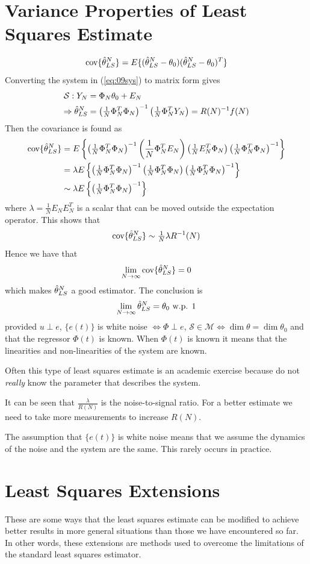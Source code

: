 \section{Variance Properties of Least Squares Estimate}
$$\text{cov}\{\hat{\theta}_{LS}^N\} = E\{(\hat{\theta}_{LS}^N-\theta_0)(\hat{\theta}_{LS}^N-\theta_0)^T\}$$
Converting the system in (\ref{eq:09sys}) to matrix form gives
\begin{align*}
\mathcal{S}: Y_N &= \Phi_N\theta_0+E_N \\
\Rightarrow \hat{\theta}_{LS}^N &= \left(\tfrac{1}{N}\Phi_N^T\Phi_N\right)^{-1}\left(\tfrac{1}{N}\Phi_N^TY_N\right) = R(N)^{-1}f(N)
\end{align*}
Then the covariance is found as
\begin{align*}
\text{cov}\{\hat{\theta}_{LS}^N\} &= E\left\lbrace\left(\tfrac{1}{N}\Phi_N^T\Phi_N\right)^{-1} \left(\frac{1}{N}\Phi_N^TE_N\right) \left(\tfrac{1}{N}E_N^T\Phi_N\right) \left(\tfrac{1}{N}\Phi_N^T\Phi_N\right)^{-1}\right\rbrace \\
&= \lambda E\left\lbrace\left(\tfrac{1}{N}\Phi_N^T\Phi_N\right)^{-1} \left(\tfrac{1}{N}\Phi_N^T\Phi_N\right) \left(\tfrac{1}{N}\Phi_N^T\Phi_N\right)^{-1}\right\rbrace \\
&\sim \lambda E\left\lbrace\left(\tfrac{1}{N}\Phi_N^T\Phi_N\right)^{-1}\right\rbrace
\end{align*}
where $\lambda = \frac{1}{N}E_NE_N^T$ is a scalar that can be moved outside the expectation operator. This shows that
$$\text{cov}\{\hat{\theta}_{LS}^N\} \sim \tfrac{1}{N}\lambda R^{-1}(N)$$
Hence we have that
$$\lim_{N\to\infty}\text{cov}\{\hat{\theta}_{LS}^N\} = 0$$
which makes $\hat{\theta}_{LS}^N$ a good estimator. The conclusion is
$$\lim_{N\to\infty}\hat{\theta}_{LS}^N = \theta_0 \text{ w.p. } 1$$
provided $u\perp e$, $\{e(t)\}$ is white noise $\Leftrightarrow \Phi\perp e$, $\mathcal{S}\in\mathcal{M} \Leftrightarrow \dim\theta = \dim\theta_0$ and that the regressor $\Phi(t)$ is known. When $\Phi(t)$ is known it means that the linearities and non-linearities of the system are known.

Often this type of least squares estimate is an academic exercise because do not \textit{really} know the parameter that describes the system.

It can be seen that $\frac{\lambda}{R(N)}$ is the noise-to-signal ratio. For a better estimate we need to take more measurements to increase $R(N)$.

The assumption that $\{e(t)\}$ is white noise means that we assume the dynamics of the noise and the system are the same. This rarely occurs in practice.

\section{Least Squares Extensions}
These are some ways that the least squares estimate can be modified to achieve better results in more general situations than those we have encountered so far. In other words, these extensions are methods used to overcome the limitations of the standard least squares estimator.

